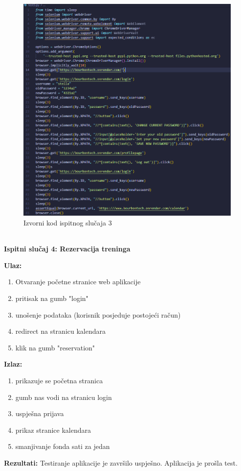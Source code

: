 					\begin{figure}[H]
					\includegraphics[scale=0.4]{dijagrami/test3.png} %
					\centering
					\caption{Izvorni kod ispitnog slučaja 3}
					\label{fig:ispitnislucaj3}
				\end{figure}\\
				
				
				\textbf{Ispitni slučaj 4: Rezervacija treninga}
				
				\textbf{Ulaz:}
				\begin{enumerate}
					\item Otvaranje početne stranice web aplikacije
					\item pritisak na gumb "login"
					\item unošenje podataka (korisnik posjeduje postojeći račun)
					\item redirect na stranicu kalendara
					\item klik na gumb "reservation"
					
				\end{enumerate}
				\textbf{Izlaz:}
				\begin{enumerate}
					\item prikazuje se početna stranica
					\item gumb nas vodi na stranicu login
					\item uspješna prijava
					\item prikaz stranice kalendara
					\item smanjivanje fonda sati za jedan
				\end{enumerate}
				\textbf{Rezultati:} {Testiranje aplikacije je završilo uspješno. \color{green} Aplikacija je prošla test.}\\\\
				
